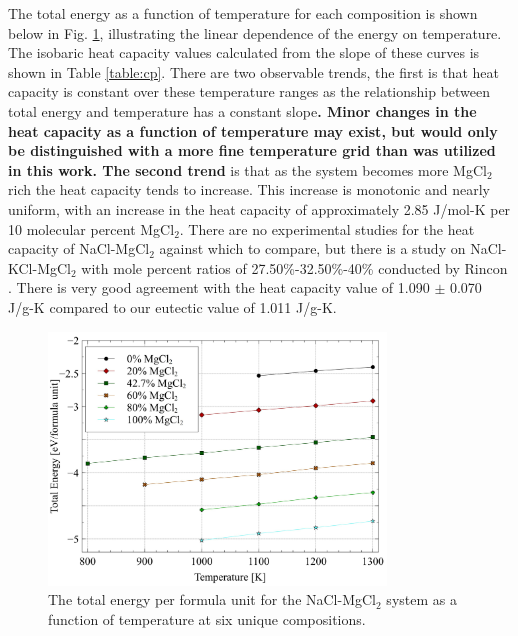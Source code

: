 \documentclass[review]{elsarticle}
\providecommand{\DIFaddtex}[1]{{\bf #1}} %
\providecommand{\DIFdeltex}[1]{} %
\providecommand{\DIFaddbegin}{\protect\color{blue}} %
\providecommand{\DIFaddend}{\protect\color{black}} %
\providecommand{\DIFdelbegin}{\protect\color{red}} %
\providecommand{\DIFdelend}{\protect\color{black}} %
\providecommand{\DIFadd}[1]{\texorpdfstring{\DIFaddtex{#1}}{#1}} %
\providecommand{\DIFdel}[1]{\texorpdfstring{\DIFdeltex{#1}}{}} %
\newcommand{\DIFscaledelfig}{0.5}
\newlength{\DIFdelgraphicswidth} %
\newlength{\DIFdelgraphicsheight} %
\newcommand{\DIFaddincludegraphics}[2][]{{\color{blue}\fbox{\DIFOincludegraphics[#1]{#2}}}} %
\newcommand{\DIFdelincludegraphics}[2][]{%
\sbox{\DIFdelgraphicsbox}{\DIFOincludegraphics[#1]{#2}}%
\settoboxwidth{\DIFdelgraphicswidth}{\DIFdelgraphicsbox} %
\settoboxtotalheight{\DIFdelgraphicsheight}{\DIFdelgraphicsbox} %
\scalebox{\DIFscaledelfig}{%
\parbox[b]{\DIFdelgraphicswidth}{\usebox{\DIFdelgraphicsbox}\\[-\baselineskip] \rule{\DIFdelgraphicswidth}{0em}}\llap{\resizebox{\DIFdelgraphicswidth}{\DIFdelgraphicsheight}{%
\setlength{\unitlength}{\DIFdelgraphicswidth}%
\begin{picture}(1,1)%
\thicklines\linethickness{2pt} %
{\color[rgb]{1,0,0}\put(0,0){\framebox(1,1){}}}%
{\color[rgb]{1,0,0}\put(0,0){\line( 1,1){1}}}%
{\color[rgb]{1,0,0}\put(0,1){\line(1,-1){1}}}%
\end{picture}%
}\hspace*{3pt}}} %
} %
\DeclareRobustCommand{\DIFaddbegin}{\DIFOaddbegin \let\includegraphics\DIFaddincludegraphics} %
\DeclareRobustCommand{\DIFaddend}{\DIFOaddend \let\includegraphics\DIFOincludegraphics} %
\DeclareRobustCommand{\DIFdelbegin}{\DIFOdelbegin \let\includegraphics\DIFdelincludegraphics} %
\DeclareRobustCommand{\DIFdelend}{\DIFOaddend \let\includegraphics\DIFOincludegraphics} %
\begin{document}
\FloatBarrier

The total energy as a function of temperature for each composition is shown below in Fig. \ref{fig:energy}, illustrating the linear dependence of the energy on temperature. The isobaric heat capacity values calculated from the slope of these curves is shown in Table \ref{table:cp}. There are two observable trends, the first is that heat capacity is constant over these temperature ranges as the relationship between total energy and temperature has a constant slope\DIFdelbegin \DIFdel{, and the second }\DIFdelend \DIFaddbegin \DIFadd{. Minor changes in the heat capacity as a function of temperature may exist, but would only be distinguished with a more fine temperature grid than was utilized in this work. The second trend }\DIFaddend is that as the system becomes more MgCl$_2$ rich the heat capacity tends to increase. This increase is monotonic and nearly uniform, with an increase in the heat capacity of approximately 2.85 J/mol-K per 10 molecular percent MgCl$_2$. There are no experimental studies for the heat capacity of NaCl-MgCl$_2$ against which to compare, but there is a study on NaCl-KCl-MgCl$_2$ with mole percent ratios of 27.50\%-32.50\%-40\% conducted by Rincon \cite{del2020experimental}. There is very good agreement with the heat capacity value of 1.090 $\pm$ 0.070 J/g-K compared to our eutectic value of 1.011 J/g-K.

\begin{figure}[h]
 \centering
 \includegraphics[width=0.8\textwidth]{energy.jpg} 
 \caption{The total energy per formula unit for the NaCl-MgCl$_2$ system as a function of temperature at six unique compositions.}
 \label{fig:energy}
\end{figure}
\end{document}

